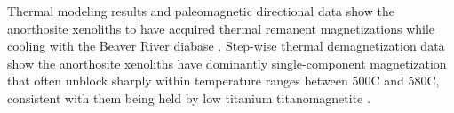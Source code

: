 \documentclass[9pt,twocolumn,twoside,lineno]{pnas-new}
\begin{document}

Thermal modeling results and paleomagnetic directional data show the anorthosite xenoliths to have acquired thermal remanent magnetizations while cooling with the Beaver River diabase \cite{Zhang2021b}. Step-wise thermal demagnetization data show the anorthosite xenoliths have dominantly single-component magnetization that often unblock sharply within temperature ranges between 500\textdegree C and 580\textdegree C, consistent with them being held by low titanium titanomagnetite \cite{Zhang2021b}.
\end{document}
